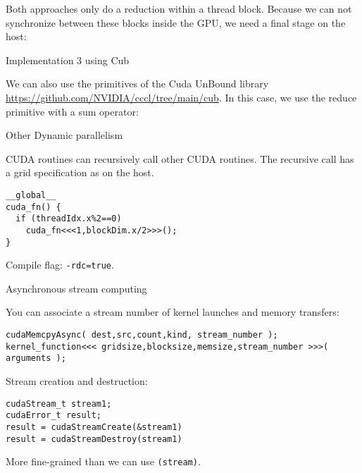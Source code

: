 Both approaches only do a reduction within a thread block.
Because we can not synchronize between these blocks inside the GPU,
we need a final stage on the host:

 {Implementation 3 using Cub}

We can also use the primitives of the Cuda UnBound library
\url{https://github.com/NVIDIA/cccl/tree/main/cub}.
In this case, we use the reduce primitive
with a sum operator:

 {Other}
 {Dynamic parallelism}

\ac{CUDA} routines can recursively call other
\ac{CUDA} routines.
The recursive call has a grid specification
as on the host.
\begin{lstlisting}
__global__
cuda_fn() {
  if (threadIdx.x%2==0)
    cuda_fn<<<1,blockDim.x/2>>>();
}
\end{lstlisting}

Compile flag: \lstinline[language=bash]{-rdc=true}.

 {Asynchronous stream computing}

You can associate a stream number of kernel launches and memory transfers:
\begin{lstlisting}
cudaMemcpyAsync( dest,src,count,kind, stream_number );
kernel_function<<< gridsize,blocksize,memsize,stream_number >>>( arguments );
\end{lstlisting}

Stream creation and destruction:
\begin{lstlisting}
cudaStream_t stream1;
cudaError_t result;
result = cudaStreamCreate(&stream1)
result = cudaStreamDestroy(stream1)
\end{lstlisting}

More fine-grained than 
we can use \lstinline{(stream)}.
